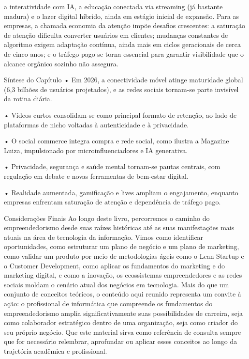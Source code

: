 a interatividade com IA, a educação conectada via streaming (já bastante madura) e o lazer digital híbrido, ainda em estágio inicial de expansão. Para as empresas, a chamada economia da atenção impõe desafios crescentes: a saturação de atenção dificulta converter usuários em clientes; mudanças constantes de algoritmo exigem adaptação contínua, ainda mais em ciclos geracionais de cerca de cinco anos; e o tráfego pago se torna essencial para garantir visibilidade que o alcance orgânico sozinho não assegura.

Síntese do Capítulo • Em 2026, a conectividade móvel atinge maturidade global (6,3 bilhões de usuários projetados), e as redes sociais tornam-se parte invisível da rotina diária.

• Vídeos curtos consolidam-se como principal formato de retenção, ao lado de plataformas de nicho voltadas à autenticidade e à privacidade.

• O social commerce integra compra e rede social, como ilustra a Magazine Luiza, impulsionado por microinfluenciadores e IA generativa.

• Privacidade, segurança e saúde mental tornam-se pautas centrais, com regulação em debate e novas ferramentas de bem-estar digital.

• Realidade aumentada, gamificação e lives ampliam o engajamento, enquanto empresas enfrentam saturação de atenção e dependência de tráfego pago.

Considerações Finais Ao longo deste livro, percorremos o caminho do empreendedorismo desde suas raízes históricas até as suas manifestações mais atuais na área de tecnologia da informação. Vimos como identificar oportunidades, como estruturar um plano de negócio e um plano de marketing, como validar um produto por meio de metodologias ágeis como o Lean Startup e o Customer Development, como aplicar os fundamentos do marketing e do marketing digital, e como a inovação, os ecossistemas empreendedores e as redes sociais moldam o cenário atual dos negócios em tecnologia. Mais do que um conjunto de conceitos teóricos, o conteúdo aqui reunido representa um convite à ação: o profissional de informática que compreende os fundamentos do empreendedorismo amplia significativamente suas possibilidades de carreira, seja como colaborador estratégico dentro de uma organização, seja como criador do seu próprio negócio. Que este material sirva como referência de consulta sempre que for necessário relembrar, aprofundar ou aplicar esses conceitos ao longo da trajetória acadêmica e profissional.
